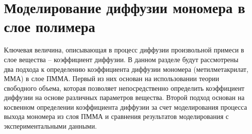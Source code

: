 \section{Моделирование диффузии мономера в слое полимера}
Ключевая величина, описывающая в процесс диффузии произвольной примеси в слое вещества -- коэффициент диффузии. В данном разделе будут рассмотрены два подхода к определению коэффициента диффузии мономера (метилметакрилат, ММА) в слое ПММА. Первый из них основан на использовании теории свободного объема, которая позволяет непосредственно определить коэффициент диффузии на основе различных параметров вещества. Второй подход основан на косвенном определении коэффициента диффузии за счет моделирования процесса выхода мономера из слоя ПММА и сравнения результатов моделирования с экспериментальными данными.

